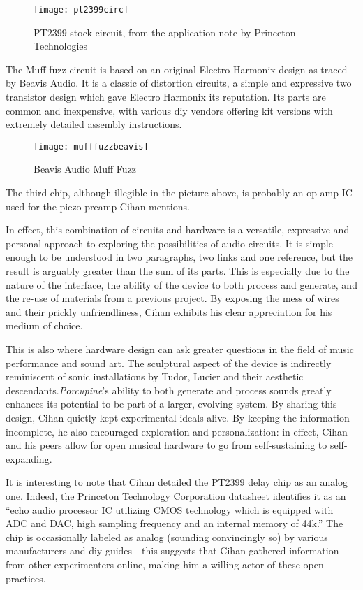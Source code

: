 	\begin{figure}[h!]
	  \caption{PT2399 stock circuit, from the application note by Princeton Technologies}
	  \centering
	    \texttt{[image: pt2399circ]}
	\end{figure}
	
The Muff fuzz circuit is based on an original Electro-Harmonix design as traced by Beavis Audio. It is a classic of distortion circuits, a simple and expressive two transistor design which gave Electro Harmonix its reputation. Its parts are common and inexpensive, with various diy vendors offering kit versions with extremely detailed assembly instructions.

	\begin{figure}[h!]
	  \caption{Beavis Audio Muff Fuzz}
	  \centering
	    \texttt{[image: mufffuzzbeavis]}
	\end{figure}
	
The third chip, although illegible in the picture above, is probably an op-amp IC used for the piezo preamp Cihan mentions. 

In effect, this combination of circuits and hardware is a versatile, expressive and personal approach to exploring the possibilities of audio circuits. It is simple enough to be understood in two paragraphs, two links and one reference, but the result is arguably greater than the sum of its parts. This is especially due to the nature of the interface, the ability of the device to both process and generate, and the re-use of materials from a previous project. By exposing the mess of wires and their prickly unfriendliness, Cihan exhibits his clear appreciation for his medium of choice.

This is also where hardware design can ask greater questions in the field of music performance and sound art. The sculptural aspect of the device is indirectly reminiscent of sonic installations by Tudor, Lucier and their aesthetic descendants.\emph{Porcupine}'s ability to both generate and process sounds greatly enhances its potential to be part of a larger, evolving system. By sharing this design, Cihan quietly kept experimental ideals alive. By keeping the information incomplete, he also encouraged exploration and personalization: in effect, Cihan and his peers allow for open musical hardware to go from self-sustaining to self-expanding. 

It is interesting to note that Cihan detailed the PT2399 delay chip as an analog one. Indeed, the Princeton Technology Corporation datasheet identifies it as an ``echo audio processor IC utilizing CMOS technology which is equipped with ADC and DAC, high sampling frequency and an internal memory of 44k.'' \citep{princetonpt} The chip is occasionally labeled as analog (sounding convincingly so) by various manufacturers and diy guides - this suggests that Cihan gathered information from other experimenters online, making him a willing actor of these open practices. 
 
